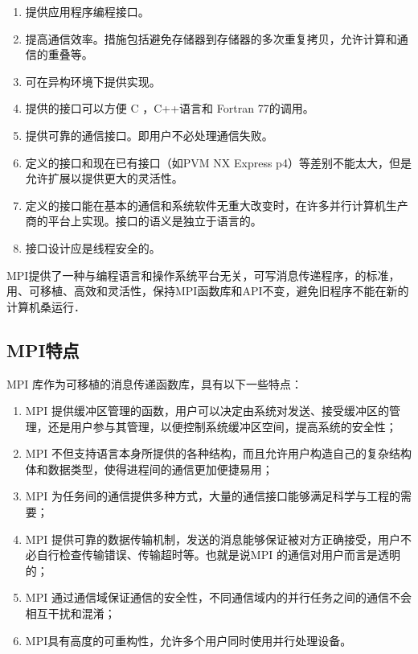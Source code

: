 \begin{enumerate}
\item 提供应用程序编程接口。

\item 提高通信效率。措施包括避免存储器到存储器的多次重复拷贝，允许计算和通信的重叠等。

\item 可在异构环境下提供实现。

\item 提供的接口可以方便 C ，C++语言和 Fortran 77的调用。

\item 提供可靠的通信接口。即用户不必处理通信失败。

\item 定义的接口和现在已有接口（如PVM NX Express p4）等差别不能太大，但是允许扩展以提供更大的灵活性。

\item 定义的接口能在基本的通信和系统软件无重大改变时，在许多并行计算机生产商的平台上实现。接口的语义是独立于语言的。

\item 接口设计应是线程安全的。
\end{enumerate}

MPI提供了一种与编程语言和操作系统平台无关，可写消息传递程序，的标准，
用、可移植、高效和灵活性，保持MPI函数库和API不变，避免旧程序不能在新的
计算机桑运行．

\subsection{MPI特点}
MPI 库作为可移植的消息传递函数库，具有以下一些特点：

\begin{enumerate}
\item MPI 提供缓冲区管理的函数，用户可以决定由系统对发送、接受缓冲区的管理，还是用户参与其管理，以便控制系统缓冲区空间，提高系统的安全性；
\item MPI 不但支持语言本身所提供的各种结构，而且允许用户构造自己的复杂结构体和数据类型，使得进程间的通信更加便捷易用；
\item MPI 为任务间的通信提供多种方式，大量的通信接口能够满足科学与工程的需要；
\item MPI 提供可靠的数据传输机制，发送的消息能够保证被对方正确接受，用户不必自行检查传输错误、传输超时等。也就是说MPI 的通信对用户而言是透明的；
\item MPI 通过通信域保证通信的安全性，不同通信域内的并行任务之间的通信不会相互干扰和混淆；
\item MPI具有高度的可重构性，允许多个用户同时使用并行处理设备。
\end{enumerate}

